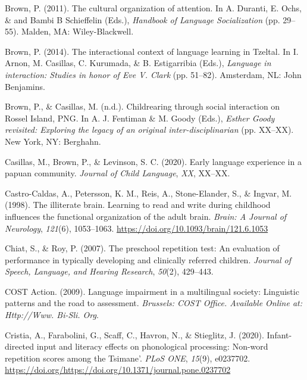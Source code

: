 \documentclass[english,,man,floatsintext]{apa6}
\begin{document}
\leavevmode\hypertarget{ref-brown2011cultural}{}%
Brown, P. (2011). The cultural organization of attention. In A. Duranti, E. Ochs, \& and Bambi B Schieffelin (Eds.), \emph{Handbook of Language Socialization} (pp. 29--55). Malden, MA: Wiley-Blackwell.

\leavevmode\hypertarget{ref-brown2014interactional}{}%
Brown, P. (2014). The interactional context of language learning in Tzeltal. In I. Arnon, M. Casillas, C. Kurumada, \& B. Estigarribia (Eds.), \emph{Language in interaction: Studies in honor of Eve V. Clark} (pp. 51--82). Amsterdam, NL: John Benjamins.

\leavevmode\hypertarget{ref-brownIPchildrearing}{}%
Brown, P., \& Casillas, M. (n.d.). Childrearing through social interaction on Rossel Island, PNG. In A. J. Fentiman \& M. Goody (Eds.), \emph{Esther Goody revisited: Exploring the legacy of an original inter-disciplinarian} (pp. XX--XX). New York, NY: Berghahn.

\leavevmode\hypertarget{ref-casillas2020early}{}%
Casillas, M., Brown, P., \& Levinson, S. C. (2020). Early language experience in a papuan community. \emph{Journal of Child Language}, \emph{XX}, XX--XX.

\leavevmode\hypertarget{ref-castro1998illiterate}{}%
Castro-Caldas, A., Petersson, K. M., Reis, A., Stone-Elander, S., \& Ingvar, M. (1998). The illiterate brain. Learning to read and write during childhood influences the functional organization of the adult brain. \emph{Brain: A Journal of Neurology}, \emph{121}(6), 1053--1063. \url{https://doi.org/10.1093/brain/121.6.1053}

\leavevmode\hypertarget{ref-chiat2007preschool}{}%
Chiat, S., \& Roy, P. (2007). The preschool repetition test: An evaluation of performance in typically developing and clinically referred children. \emph{Journal of Speech, Language, and Hearing Research}, \emph{50}(2), 429--443.

\leavevmode\hypertarget{ref-is08042009language}{}%
COST Action. (2009). Language impairment in a multilingual society: Linguistic patterns and the road to assessment. \emph{Brussels: COST Office. Available Online at: Http://Www. Bi-Sli. Org}.

\leavevmode\hypertarget{ref-cristia2020infant}{}%
Cristia, A., Farabolini, G., Scaff, C., Havron, N., \& Stieglitz, J. (2020). Infant-directed input and literacy effects on phonological processing: Non-word repetition scores among the Tsimane'. \emph{PLoS ONE}, \emph{15}(9), e0237702. \url{https://doi.org/https://doi.org/10.1371/journal.pone.0237702}
\end{document}
